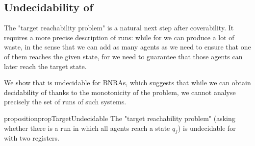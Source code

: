 \subsection{Undecidability of \Target}
\label{sec:undec-target}

The "target reachability problem" is a natural next step after coverability. 
It requires a more precise description of runs: while for \COVER we can produce a lot of waste, in the sense that we can add as many agents as we need to ensure that one of them reaches the given state, for \Target we need to guarantee that those agents can later reach the target state.

We show that \Target is undecidable for BNRAs, which suggests that while we can obtain decidability of \COVER thanks to the monotonicity of the problem, we cannot analyse precisely the set of runs of such systems.


\begin{restatable}{proposition}{propTargetUndecidable}
\label{prop:target-undec}
	The "target reachability problem" (asking whether there is a run in which all agents reach a state $q_f$) is undecidable for \BNRA with two registers.
\end{restatable}
